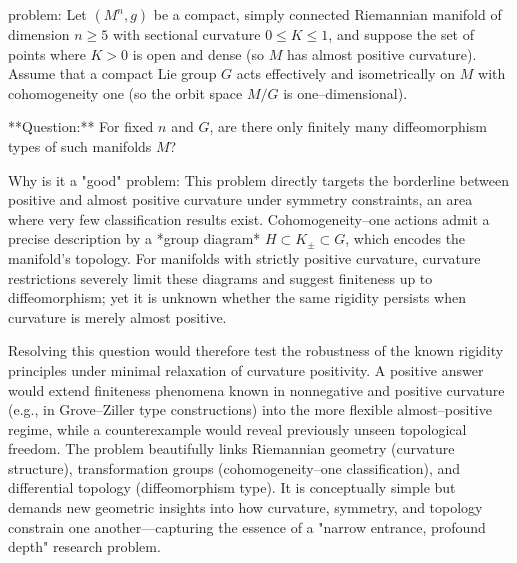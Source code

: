 problem:  
Let \( (M^n,g) \) be a compact, simply connected Riemannian manifold of dimension \( n \ge 5 \) with sectional curvature \( 0 \le K \le 1 \), and suppose the set of points where \( K>0 \) is open and dense (so \( M \) has almost positive curvature). Assume that a compact Lie group \( G \) acts effectively and isometrically on \( M \) with cohomogeneity one (so the orbit space \( M/G \) is one–dimensional).  

**Question:**  
For fixed \( n \) and \( G \), are there only finitely many diffeomorphism types of such manifolds \( M \)?  

Why is it a "good" problem:  
This problem directly targets the borderline between positive and almost positive curvature under symmetry constraints, an area where very few classification results exist. Cohomogeneity–one actions admit a precise description by a *group diagram* \( H \subset K_\pm \subset G \), which encodes the manifold’s topology. For manifolds with strictly positive curvature, curvature restrictions severely limit these diagrams and suggest finiteness up to diffeomorphism; yet it is unknown whether the same rigidity persists when curvature is merely almost positive.  

Resolving this question would therefore test the robustness of the known rigidity principles under minimal relaxation of curvature positivity. A positive answer would extend finiteness phenomena known in nonnegative and positive curvature (e.g., in Grove–Ziller type constructions) into the more flexible almost–positive regime, while a counterexample would reveal previously unseen topological freedom. The problem beautifully links Riemannian geometry (curvature structure), transformation groups (cohomogeneity–one classification), and differential topology (diffeomorphism type). It is conceptually simple but demands new geometric insights into how curvature, symmetry, and topology constrain one another—capturing the essence of a "narrow entrance, profound depth" research problem.